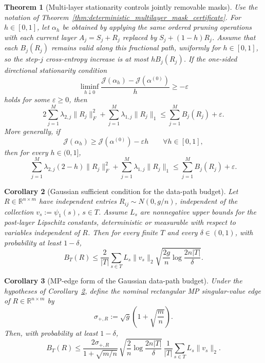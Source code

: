 \documentclass[11pt]{article}
\theoremstyle{plain}
\newtheorem{thm}{Theorem}[section]
\newtheorem{cor}[thm]{Corollary}
\theoremstyle{definition}
\theoremstyle{remark}
\newcommand{\R}{\mathbb{R}}
\newcommand{\1}{\mathbf{1}}
\begin{document}
\begin{thm}[Multi-layer stationarity controls jointly removable masks]
\label{thm:deterministic_multilayer_mask_stationarity}
Use the notation of Theorem~\ref{thm:deterministic_multilayer_mask_certificate}. For \(h\in[0,1]\), let \(\alpha_h\) be obtained by applying the same ordered pruning operations with each current layer \(A_j=S_j+R_j\) replaced by \(S_j+(1-h)R_j\). Assume that each \(B_j(R_j)\) remains valid along this fractional path, uniformly for \(h\in[0,1]\), so the step-\(j\) cross-entropy increase is at most \(hB_j(R_j)\). If the one-sided directional stationarity condition
\[
\liminf_{h\downarrow0}
\frac{\mathcal J(\alpha_h)-\mathcal J(\alpha^{(0)})}{h}
\ge
-\varepsilon
\]
holds for some \(\varepsilon\ge0\), then
\[
2\sum_{j=1}^M\lambda_{2,j}\|R_j\|_F^2
+
\sum_{j=1}^M\lambda_{1,j}\|R_j\|_1
\le
\sum_{j=1}^M B_j(R_j)+\varepsilon.
\]
More generally, if
\[
\mathcal J(\alpha_h)\ge\mathcal J(\alpha^{(0)})-\varepsilon h
\qquad\forall h\in[0,1],
\]
then for every \(h\in(0,1]\),
\[
\sum_{j=1}^M\lambda_{2,j}(2-h)\|R_j\|_F^2
+
\sum_{j=1}^M\lambda_{1,j}\|R_j\|_1
\le
\sum_{j=1}^M B_j(R_j)+\varepsilon.
\]
\end{thm}

\begin{cor}[Gaussian sufficient condition for the data-path budget]
\label{cor:gaussian_data_path_budget}
Let \(R\in\R^{n\times m}\) have independent entries \(R_{ij}\sim N(0,g/n)\), independent of the collection \(v_s:=\psi_1(s)\), \(s\in T\). Assume \(L_s\) are nonnegative upper bounds for the post-layer Lipschitz constants, deterministic or measurable with respect to variables independent of \(R\). Then for every finite \(T\) and every \(\delta\in(0,1)\), with probability at least \(1-\delta\),
\[
B_T(R)
\le
\frac2{|T|}
\sum_{s\in T}
L_s\|v_s\|_2
\sqrt{
\frac{2g}{n}\log\frac{2n|T|}{\delta}
}.
\]
\end{cor}

\begin{cor}[MP-edge form of the Gaussian data-path budget]
\label{cor:mp_edge_data_path_budget}
Under the hypotheses of Corollary~\ref{cor:gaussian_data_path_budget}, define the nominal rectangular MP singular-value edge of \(R\in\R^{n\times m}\) by
\[
\sigma_{+,R}:=\sqrt g\left(1+\sqrt{\frac{m}{n}}\right).
\]
Then, with probability at least \(1-\delta\),
\[
B_T(R)
\le
\frac{2\sigma_{+,R}}{1+\sqrt{m/n}}\,
\sqrt{\frac{2}{n}\log\frac{2n|T|}{\delta}}\,
\frac1{|T|}\sum_{s\in T}L_s\|v_s\|_2.
\]
\end{cor}
\end{document}
